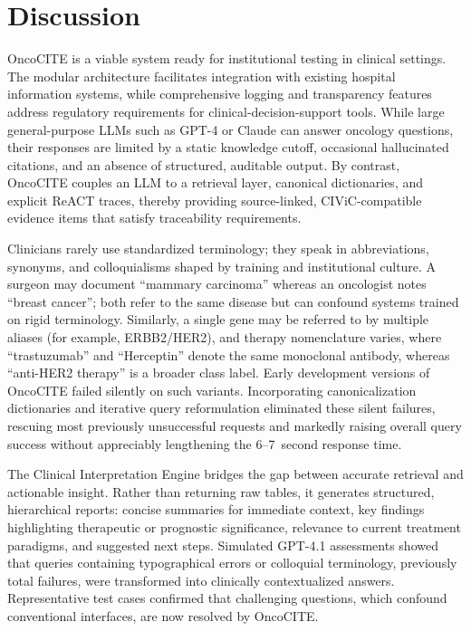 % 
%
%

\section{Discussion}\label{sec3}

OncoCITE is a viable system ready for institutional testing in clinical settings. The modular architecture facilitates integration with existing hospital information systems, while comprehensive logging and transparency features address regulatory requirements for clinical-decision-support tools. While large general-purpose LLMs such as GPT-4 or Claude can answer oncology questions, their responses are limited by a static knowledge cutoff, occasional hallucinated citations, and an absence of structured, auditable output. By contrast, OncoCITE couples an LLM to a retrieval layer, canonical dictionaries, and explicit ReACT traces, thereby providing source-linked, CIViC-compatible evidence items that satisfy traceability requirements.

Clinicians rarely use standardized terminology; they speak in abbreviations, synonyms, and colloquialisms shaped by training and institutional culture. A surgeon may document ``mammary carcinoma'' whereas an oncologist notes ``breast cancer''; both refer to the same disease but can confound systems trained on rigid terminology. Similarly, a single gene may be referred to by multiple aliases (for example, ERBB2/HER2), and therapy nomenclature varies, where ``trastuzumab'' and ``Herceptin'' denote the same monoclonal antibody, whereas ``anti-HER2 therapy'' is a broader class label. Early development versions of OncoCITE failed silently on such variants. Incorporating canonicalization dictionaries and iterative query reformulation eliminated these silent failures, rescuing most previously unsuccessful requests and markedly raising overall query success without appreciably lengthening the 6--7~second response time.

The Clinical Interpretation Engine bridges the gap between accurate retrieval and actionable insight. Rather than returning raw tables, it generates structured, hierarchical reports: concise summaries for immediate context, key findings highlighting therapeutic or prognostic significance, relevance to current treatment paradigms, and suggested next steps. Simulated GPT-4.1 assessments showed that queries containing typographical errors or colloquial terminology, previously total failures, were transformed into clinically contextualized answers. Representative test cases confirmed that challenging questions, which confound conventional interfaces, are now resolved by OncoCITE.

